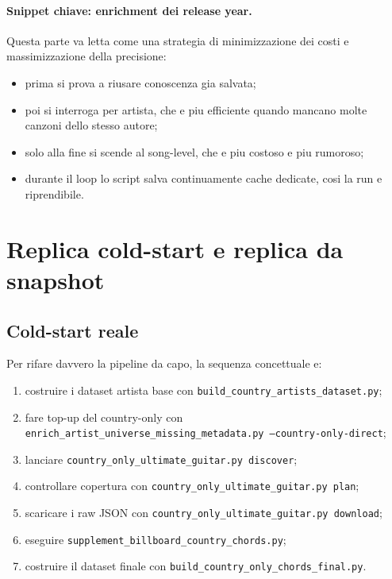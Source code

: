 \documentclass[11pt]{article}
\begin{document}


\paragraph{Snippet chiave: enrichment dei release year.}


Questa parte va letta come una strategia di minimizzazione dei costi e massimizzazione della precisione:
\begin{itemize}[leftmargin=2em]
\item prima si prova a riusare conoscenza gia salvata;
\item poi si interroga per artista, che e piu efficiente quando mancano molte canzoni dello stesso autore;
\item solo alla fine si scende al song-level, che e piu costoso e piu rumoroso;
\item durante il loop lo script salva continuamente cache dedicate, cosi la run e riprendibile.
\end{itemize}

\section{Replica cold-start e replica da snapshot}
\subsection{Cold-start reale}
Per rifare davvero la pipeline da capo, la sequenza concettuale e:
\begin{enumerate}[leftmargin=2em]
\item costruire i dataset artista base con \texttt{build\_country\_artists\_dataset.py};
\item fare top-up del country-only con \texttt{enrich\_artist\_universe\_missing\_metadata.py --country-only-direct};
\item lanciare \texttt{country\_only\_ultimate\_guitar.py discover};
\item controllare copertura con \texttt{country\_only\_ultimate\_guitar.py plan};
\item scaricare i raw JSON con \texttt{country\_only\_ultimate\_guitar.py download};
\item eseguire \texttt{supplement\_billboard\_country\_chords.py};
\item costruire il dataset finale con \texttt{build\_country\_only\_chords\_final.py}.
\end{enumerate}
\end{document}
